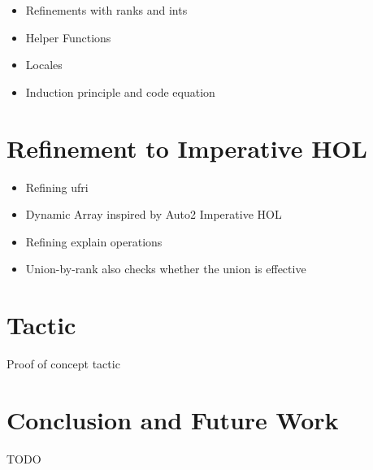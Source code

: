 \documentclass[
  sigplan,
  10pt,
  anonymous,
  review,
  ]{acmart}
\begin{document}
\begin{itemize}
  \item Refinements with ranks and ints
  \item Helper Functions
  \item Locales
  \item Induction principle and code equation
\end{itemize}

\section{Refinement to Imperative HOL}
\begin{itemize}
  \item Refining ufri
  \item Dynamic Array inspired by Auto2 Imperative HOL
  \item Refining explain operations
  \item Union-by-rank also checks whether the union is effective
\end{itemize}

\section{Tactic}
Proof of concept tactic

\section{Conclusion and Future Work}

\begin{acks}
  TODO
\end{acks}

\printglossary[type=\acronymtype]



\end{document}
